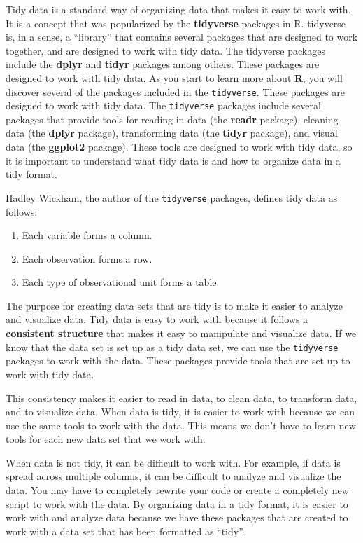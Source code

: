 \documentclass[
  letterpaper,
  DIV=11,
  numbers=noendperiod]{scrreprt}
\providecommand{\tightlist}{%
  \setlength{\itemsep}{0pt}\setlength{\parskip}{0pt}}\usepackage{longtable,booktabs,array}
\begin{document}
Tidy data is a standard way of organizing data that makes it easy to
work with. It is a concept that was popularized by the
\textbf{tidyverse} packages in R. tidyverse is, in a sense, a
``library'' that contains several packages that are designed to work
together, and are designed to work with tidy data. The tidyverse
packages include the \textbf{dplyr} and \textbf{tidyr} packages among
others. These packages are designed to work with tidy data. As you start
to learn more about \textbf{R}, you will discover several of the
packages included in the \texttt{tidyverse}. These packages are designed
to work with tidy data. The \texttt{tidyverse} packages include several
packages that provide tools for reading in data (the \textbf{readr}
package), cleaning data (the \textbf{dplyr} package), transforming data
(the \textbf{tidyr} package), and visual data (the \textbf{ggplot2}
package). These tools are designed to work with tidy data, so it is
important to understand what tidy data is and how to organize data in a
tidy format.

Hadley Wickham, the author of the \texttt{tidyverse} packages, defines
tidy data as follows:

\begin{enumerate}
\def\labelenumi{\arabic{enumi}.}
\tightlist
\item
  Each variable forms a column.
\item
  Each observation forms a row.
\item
  Each type of observational unit forms a table.
\end{enumerate}

The purpose for creating data sets that are tidy is to make it easier to
analyze and visualize data. Tidy data is easy to work with because it
follows a \textbf{consistent structure} that makes it easy to manipulate
and visualize data. If we know that the data set is set up as a tidy
data set, we can use the \texttt{tidyverse} packages to work with the
data. These packages provide tools that are set up to work with tidy
data.

This consistency makes it easier to read in data, to clean data, to
transform data, and to visualize data. When data is tidy, it is easier
to work with because we can use the same tools to work with the data.
This means we don't have to learn new tools for each new data set that
we work with.

When data is not tidy, it can be difficult to work with. For example, if
data is spread across multiple columns, it can be difficult to analyze
and visualize the data. You may have to completely rewrite your code or
create a completely new script to work with the data. By organizing data
in a tidy format, it is easier to work with and analyze data because we
have these packages that are created to work with a data set that has
been formatted as ``tidy''.
\end{document}
